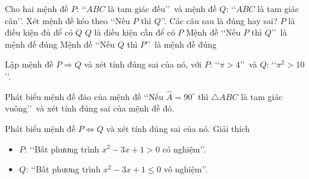 \begin{ex}%
	Cho hai mệnh đề $P$: \lq\lq$ABC$ là tam giác đều\rq\rq\ và mệnh đề $Q$: \lq\lq$ABC$ là tam giác cân\rq\rq. Xét mệnh đề kéo  theo \lq\lq Nếu $P$ thì $Q$\rq\rq. Các câu sau là đúng hay sai?
	 \choiceTF
		{\True $P$ là điều kiện đủ  để có $Q$}
		 {\True $Q$ là điều kiện cần để có $P$}
		 {\True Mệnh đề \lq\lq Nếu $P$ thì $Q$\rq\rq\ là mệnh đề đúng}
		{Mệnh  đề \lq\lq Nếu $Q$ thì $P$\rq\rq\ là mệnh đề đúng}
\end{ex}



\begin{bt}%
	Lập mệnh đề $P \Rightarrow Q$ và xét tính đúng  sai của nó, với $P$: \lq\lq $\pi > 4$\rq\rq\, và $Q$: \lq\lq$\pi^2 > 10$\rq\rq.
\end{bt}

\begin{bt}%
	Phát biểu mệnh đề đảo của mệnh đề \lq\lq Nếu $\widehat{A}=90^\circ$ thì $\triangle ABC$ là tam giác vuông\rq\rq\, và  xét tính đúng sai của mệnh đề đó.
\end{bt}

\begin{bt}%
	Phát biểu mệnh đề $P \Leftrightarrow Q$  và xét tính đúng sai của nó. Giải thích
	\begin{itemize}
		 \item $P$: \lq\lq Bất phương trình $x^2 - 3x + 1 > 0$ có nghiệm\rq\rq.
		\item $Q$: \lq\lq Bất phương trình $x^2 - 3x + 1 \leq 0$ vô nghiệm\rq\rq. 
	\end{itemize}
\end{bt}

